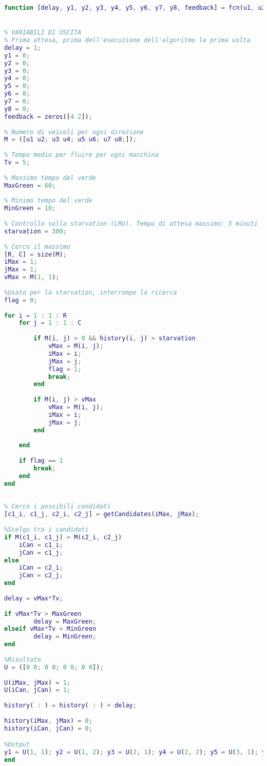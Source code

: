 \begin{lstlisting}[language=Matlab,label=key,caption=Implementazione dell'algoritmo di gestione dinamica di un singolo incrocio]
function [delay, y1, y2, y3, y4, y5, y6, y7, y8, feedback] = fcn(u1, u2, u3, u4, u5, u6, u7, u8, history)


% VARIABILI DI USCITA
% Prima attesa, prima dell'esecuzione dell'algoritmo la prima volta
delay = 1; 
y1 = 0; 
y2 = 0; 
y3 = 0; 
y4 = 0; 
y5 = 0; 
y6 = 0; 
y7 = 0;
y8 = 0;
feedback = zeros([4 2]);
 
% Numero di veicoli per ogni direzione
M = ([u1 u2; u3 u4; u5 u6; u7 u8;]);
 
% Tempo medio per fluire per ogni macchina
Tv = 5;
 
% Massimo tempo del verde
MaxGreen = 60;
 
% Minimo tempo del verde
MinGreen = 10;
 
% Controllo sulla starvation (LRU). Tempo di attesa massimo: 5 minuti
starvation = 300;
 
% Cerco il massimo
[R, C] = size(M);
iMax = 1;
jMax = 1;
vMax = M(1, 1);
 
%Usato per la starvation, interrompe la ricerca
flag = 0;
 
for i = 1 : 1 : R
    for j = 1 : 1 : C
        
        if M(i, j) > 0 && history(i, j) > starvation
            vMax = M(i, j);
            iMax = i;
            jMax = j;
            flag = 1;
            break;
        end
 
        if M(i, j) > vMax
            vMax = M(i, j);
            iMax = i;
            jMax = j;
        end
       
    end
    
    if flag == 1
        break;
    end
end
 
 
% Cerco i possibili candidati
[c1_i, c1_j, c2_i, c2_j] = getCandidates(iMax, jMax);
 
%Scelgo tra i candidati
if M(c1_i, c1_j) > M(c2_i, c2_j) 
    iCan = c1_i;
    jCan = c1_j;
else
    iCan = c2_i;
    jCan = c2_j;
end
 
delay = vMax*Tv;
 
if vMax*Tv > MaxGreen
        delay = MaxGreen;
elseif vMax*Tv < MinGreen
        delay = MinGreen;
end
    
%Risultato
U = ([0 0; 0 0; 0 0; 0 0]);
 
U(iMax, jMax) = 1;
U(iCan, jCan) = 1;
     
history( : ) = history( : ) + delay;
    
history(iMax, jMax) = 0;
history(iCan, jCan) = 0;

%Output 
y1 = U(1, 1); y2 = U(1, 2); y3 = U(2, 1); y4 = U(2, 2); y5 = U(3, 1); y6 = U(3, 2); y7 = U(4, 1); y8 = U(4, 2); feedback(:) = history(:);
end
    
\end{lstlisting}
\newpage
